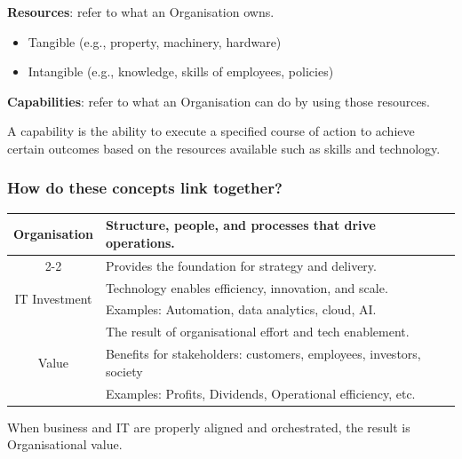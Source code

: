 \noindent

\textbf{Resources}: refer to what an Organisation owns.

\begin{itemize}
    \item Tangible (e.g., property, machinery, hardware)
    \item Intangible (e.g., knowledge, skills of employees, policies)
\end{itemize}

\textbf{Capabilities}: refer to what an Organisation can do by using those resources.

\noindent A capability is the ability to execute a specified course of action to achieve certain outcomes based on the resources available such as skills and technology.

\subsubsection{How do these concepts link together?}

\begin{table}[h]
\centering
\begin{tabular}{|c|l|}
\hline
\multirow{2}{*}{Organisation}  & Structure, people, and processes that drive operations.             \\ \cline{2-2} 
                               & Provides the foundation for strategy and delivery.                  \\ \hline
\multirow{2}{*}{IT Investment} & Technology enables efficiency, innovation, and scale.               \\ \cline{2-2} 
                               & Examples: Automation, data analytics, cloud, AI.                    \\ \hline
\multirow{3}{*}{Value}         & The result of organisational effort and tech enablement.            \\ \cline{2-2} 
                               & Benefits for stakeholders: customers, employees, investors, society \\ \cline{2-2} 
                               & Examples: Profits, Dividends, Operational efficiency, etc.          \\ \hline
\end{tabular}
\end{table}

When business and IT are properly aligned and orchestrated, the result is 
Organisational value.

